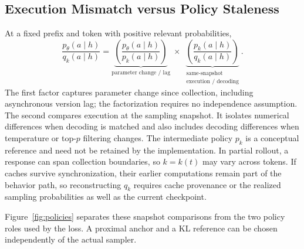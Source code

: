 \subsection{Execution Mismatch versus Policy Staleness}
At a fixed prefix and token with positive relevant probabilities,
\begin{equation}\label{eq:decomp}
\frac{p_\theta(a\mid h)}{q_k(a\mid h)}=
\underbrace{\left(\frac{p_\theta(a\mid h)}{p_k(a\mid h)}\right)}_{\text{parameter change / lag}}
\;\times\;
\underbrace{\left(\frac{p_k(a\mid h)}{q_k(a\mid h)}\right)}_{\substack{\text{same-snapshot}\\\text{execution / decoding}}}.
\end{equation}
The first factor captures parameter change since collection, including asynchronous version lag; the factorization requires no independence assumption. The second compares execution at the sampling snapshot. It isolates numerical differences when decoding is matched and also includes decoding differences when temperature or top-$p$ filtering changes. The intermediate policy $p_k$ is a conceptual reference and need not be retained by the implementation. In partial rollout, a response can span collection boundaries, so $k=k(t)$ may vary across tokens. If caches survive synchronization, their earlier computations remain part of the behavior path, so reconstructing $q_k$ requires cache provenance or the realized sampling probabilities as well as the current checkpoint.

Figure~\ref{fig:policies} separates these snapshot comparisons from the two policy roles used by the loss. A proximal anchor and a KL reference can be chosen independently of the actual sampler.

